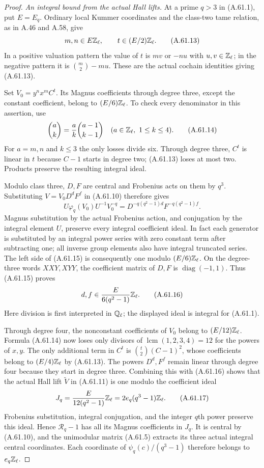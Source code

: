 \begin{proof}
\emph{An integral bound from the actual Hall lifts.}
At a prime $q>3$ in (A.61.1), put $E=E_q$.
Ordinary local Kummer coordinates and the class-two
tame relation, as in A.46 and A.58, give
\[
                 m,n\in E\mathbb Z_\ell,\qquad
                              t\in(E/2)\mathbb Z_\ell.
 \tag{A.61.13}
\]
In a positive valuation pattern the value of $t$ is
$mv$ or $-nu$ with $u,v\in\mathbb Z_\ell$; in the negative
pattern it is $\binom m2-mu$.  These are the actual
cochain identities giving (A.61.13).

Set $V_0=y^n x^mC^t$.
Its Magnus coefficients through degree three, except
the constant coefficient, belong to $(E/6)\mathbb Z_\ell$.
To check every denominator in this assertion, use
\[
                \binom ak=\frac ak\binom{a-1}{k-1}
                         \quad(a\in\mathbb Z_\ell,\ 1\le k\le4).
 \tag{A.61.14}
\]
For $a=m,n$ and $k\le3$ the only losses divide six.
Through degree three, $C^t$ is linear in $t$ because
$C-1$ starts in degree two; (A.61.13) loses at most
two.  Products preserve the resulting integral ideal.

Modulo class three, $D,F$ are central and Frobenius
acts on them by $q^3$.  Substituting
$V=V_0D^dF^f$ in (A.61.10) therefore gives
\[
 U\varphi_q(V_0)U^{-1}V_0^{-q}
                   =D^{-q(q^2-1)d}F^{-q(q^2-1)f}.
 \tag{A.61.15}
\]
Magnus substitution by the actual Frobenius action,
and conjugation by the integral element $U$, preserve
every integral coefficient ideal.  In fact each generator
is substituted by an integral power series with zero
constant term after subtracting one; all inverse group
elements also have integral truncated series.
The left side of (A.61.15) is consequently one modulo
$(E/6)\mathbb Z_\ell$.  On the degree-three words $XXY,XYY$,
the coefficient matrix of $D,F$ is
$\operatorname{diag}(-1,1)$.  Thus (A.61.15) proves
\[
                d,f\in\frac{E}{6(q^2-1)}\mathbb Z_\ell.
 \tag{A.61.16}
\]
Here division is first interpreted in $\mathbb Q_\ell$;
the displayed ideal is integral for (A.61.1).

Through degree four, the nonconstant coefficients of
$V_0$ belong to $(E/12)\mathbb Z_\ell$.
Formula (A.61.14) now loses only divisors of
$\operatorname{lcm}(1,2,3,4)=12$ for the powers
of $x,y$.  The only additional term in $C^t$ is
$\binom t2(C-1)^2$, whose coefficients belong to
$(E/4)\mathbb Z_\ell$ by (A.61.13).
The powers $D^d,F^f$ remain linear through degree
four because they start in degree three.
Combining this with (A.61.16) shows that the actual
Hall lift $\widetilde V$ in (A.61.11) is one modulo
the coefficient ideal
\[
               J_q=\frac{E}{12(q^2-1)}\mathbb Z_\ell
                         =2e_q(q^3-1)\mathbb Z_\ell.
 \tag{A.61.17}
\]
Frobenius substitution, integral conjugation, and the
integer $q$th power preserve this ideal.  Hence
$\mathcal R_q-1$ has all its Magnus coefficients
in $J_q$.  It is central by (A.61.10), and the
unimodular matrix (A.61.5) extracts its three actual
integral central coordinates.  Each coordinate of
$\psi_q(c)/(q^3-1)$ therefore belongs to
$e_q\mathbb Z_\ell$.


\end{proof}
